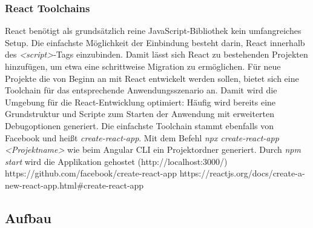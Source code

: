 \subsubsection{React Toolchains}
React benötigt als grundsätzlich reine JavaScript-Bibliothek kein umfangreiches Setup. Die einfachste Möglichkeit der Einbindung besteht darin, React innerhalb des \textit{<script>}-Tags einzubinden. Damit lässt sich React zu bestehenden Projekten hinzufügen, um etwa eine schrittweise Migration zu ermöglichen. Für neue Projekte die von Beginn an mit React entwickelt werden sollen, bietet sich eine Toolchain für das entsprechende Anwendungsszenario an. Damit wird die Umgebung für die React-Entwicklung optimiert: Häufig wird bereits eine Grundstruktur und Scripte zum Starten der Anwendung mit erweiterten Debugoptionen generiert. Die einfachste Toolchain stammt ebenfalls von Facebook und heißt \textit{create-react-app}. Mit dem Befehl \textit{npx create-react-app <Projektname>} wie beim Angular CLI ein Projektordner generiert. Durch \textit{npm start} wird die Applikation gehostet (http://localhost:3000/)
https://github.com/facebook/create-react-app
https://reactjs.org/docs/create-a-new-react-app.html#create-react-app
 
\subsection{Aufbau}
